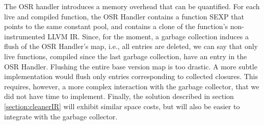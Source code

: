 The OSR handler introduces a memory overhead that can be quantified.
For each live and compiled function, the OSR Handler contains a function SEXP that points to the same constant pool, and contains a clone of the function's non-instrumented LLVM IR.
Since, for the moment, a garbage collection induces a flush of the OSR Handler's  map, i.e., all entries are deleted, we can say that only live functions, compiled since the last garbage collection, have an entry in the OSR Handler.
Flushing the entire base version map is too drastic. 
A more subtle implementation would flush only entries corresponding to collected closures.
This requires, however, a more complex interaction with the garbage collector, that we did not have time to implement.
Finally, the solution described in section \ref{section:cleanerIR} will exhibit similar space costs, but will also be easier to integrate with the garbage collector.\\
